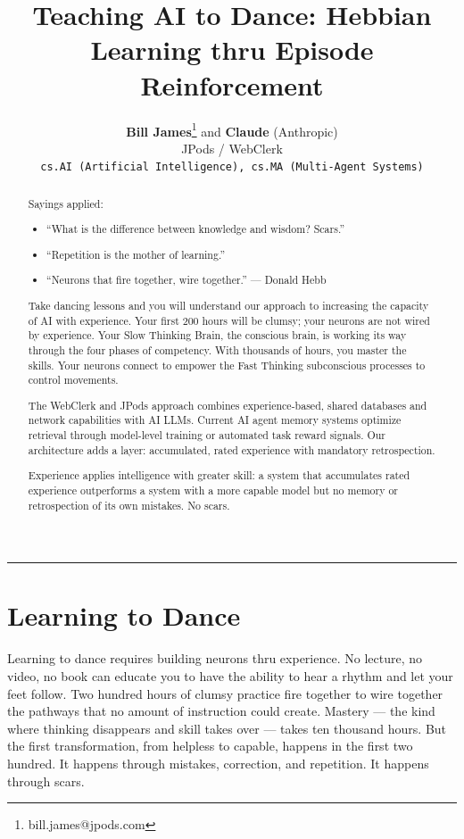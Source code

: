 \documentclass[11pt,a4paper]{article}
\title{\textbf{Teaching AI to Dance: Hebbian Learning thru Episode Reinforcement}}
\author{
    \textbf{Bill James}\thanks{bill.james@jpods.com} \quad and \quad \textbf{Claude} (Anthropic)\\
    JPods / WebClerk\\
    \texttt{cs.AI (Artificial Intelligence), cs.MA (Multi-Agent Systems)}
}
\date{}
\begin{document}
\maketitle

\begin{abstract}
\noindent Sayings applied:
\begin{itemize}[nosep,leftmargin=*]
    \item ``What is the difference between knowledge and wisdom? Scars.''
    \item ``Repetition is the mother of learning.''
    \item ``Neurons that fire together, wire together.'' --- Donald Hebb
\end{itemize}

\vspace{0.5em}
\noindent Take dancing lessons and you will understand our approach to increasing the capacity of AI with experience. Your first 200 hours will be clumsy; your neurons are not wired by experience. Your Slow Thinking Brain, the conscious brain, is working its way through the four phases of competency. With thousands of hours, you master the skills. Your neurons connect to empower the Fast Thinking subconscious processes to control movements.

\vspace{0.5em}
\noindent The WebClerk and JPods approach combines experience-based, shared databases and network capabilities with AI LLMs. Current AI agent memory systems optimize retrieval through model-level training or automated task reward signals. Our architecture adds a layer: accumulated, rated experience with mandatory retrospection.

\vspace{0.5em}
\noindent Experience applies intelligence with greater skill: a system that accumulates rated experience outperforms a system with a more capable model but no memory or retrospection of its own mistakes. No scars.
\end{abstract}

\vspace{1em}
\hrule
\vspace{1em}

\section{Learning to Dance}

Learning to dance requires building neurons thru experience. No lecture, no video, no book can educate you to have the ability to hear a rhythm and let your feet follow. Two hundred hours of clumsy practice fire together to wire together the pathways that no amount of instruction could create. Mastery --- the kind where thinking disappears and skill takes over --- takes ten thousand hours. But the first transformation, from helpless to capable, happens in the first two hundred. It happens through mistakes, correction, and repetition. It happens through scars.
\end{document}
